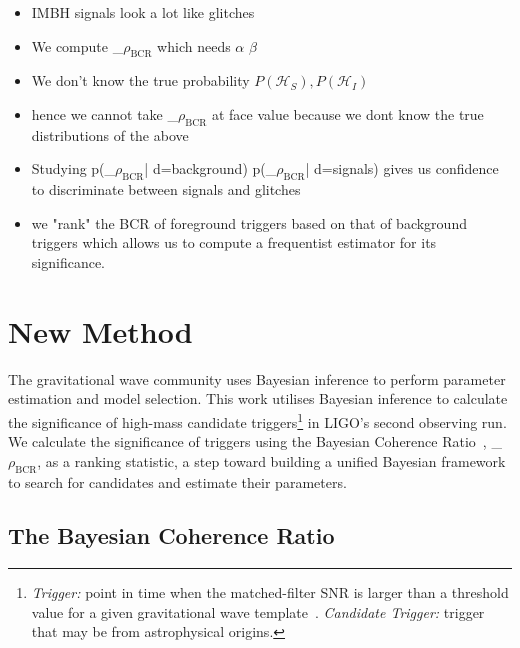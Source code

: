 \documentclass[%
 nofootinbib,
 amsmath,amssymb,
 aps,
 twocolumn
]{revtex4-2}
\newcommand{\mathcmd}[1]{{\sc \relax\ifmmode#1\else $#1$\fi}\xspace}
\newcommand{\bcr}{\mathcmd{\rho_\text{BCR}}}
\begin{document}
\begin{itemize}
    \item  IMBH signals look a lot like glitches
    \item  We compute \bcr which needs $\alpha$ $\beta$
    \item  We don't know the true probability $P(\mathcal{H}_S), P(\mathcal{H}_I)$ 
    \item hence we cannot take \bcr at face value because we dont know the true distributions of the above
    \item Studying p(\bcr| d=background) p(\bcr| d=signals) gives us confidence to discriminate between signals and glitches
    \item  we "rank" the BCR of foreground triggers based on that of background triggers which allows us to compute a frequentist estimator for its significance.
\end{itemize}




\section{New Method\label{sec:method}}

The gravitational wave community uses Bayesian inference to perform parameter estimation and model selection. This work utilises Bayesian inference to calculate the significance of high-mass candidate triggers\footnote{\textit{Trigger:} point in time when the matched-filter SNR is larger than a threshold value for a given gravitational wave template~\cite{pycbc_og1}. \textit{Candidate Trigger:} trigger that may be from astrophysical origins.} in LIGO's second observing run. We calculate the significance of triggers using the Bayesian Coherence Ratio~\cite{BCR1}, \bcr, as a ranking statistic, a step toward building a unified Bayesian framework to search for candidates and estimate their parameters.


\subsection{The Bayesian Coherence Ratio}
\end{document}
